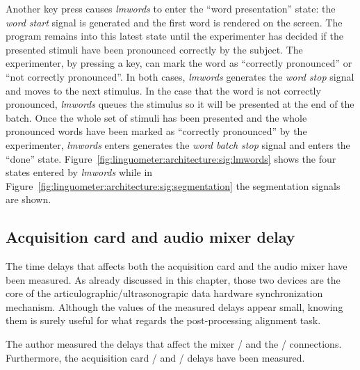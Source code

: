 
Another key press causes \emph{lmwords} to enter the ``word presentation''
state: the \emph{word start} signal is generated and the first word is 
rendered on the screen.
The program remains into this latest state until the experimenter has decided if
the presented stimuli have been pronounced correctly by the subject.
The experimenter, by pressing a key, can mark the word as ``correctly
pronounced'' or ``not correctly pronounced''. 
In both cases, \emph{lmwords} generates the \emph{word stop} signal and 
moves to the next stimulus.
In the case that the word is not correctly pronounced, \emph{lmwords} queues
the stimulus so it will be presented at the end of the batch.
Once the whole set of stimuli has been presented and the whole pronounced words
have been marked as ``correctly pronounced'' by the experimenter,
\emph{lmwords} enters generates the \emph{word batch stop} signal and enters 
the ``done'' state.
Figure~\ref{fig:linguometer:architecture:sig:lmwords} shows the four
states entered by \emph{lmwords} while 
in Figure~\ref{fig:linguometer:architecture:sig:segmentation} the segmentation
signals are shown.
\subsection{Acquisition card and audio mixer delay}
\label{sec:linguometer:technical:delay}
The time delays that affects both the acquisition card and the 
audio mixer have been measured.
As already discussed in this chapter, those two devices are the core of the
articulographic/ultrasonograpic data hardware synchronization mechanism.
Although the values of the measured delays appear small, knowing them is surely
useful for what regards the post-processing alignment task.

The author measured the delays that affect the  mixer
/ and the
/ connections.
Furthermore, the   acquisition card
/ and
/ delays have been measured.

